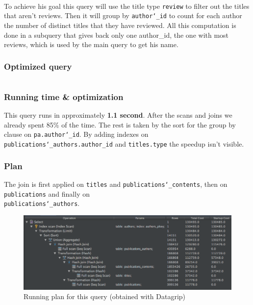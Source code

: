 \documentclass[doubleside, titlepage]{article}
\begin{document}
~\\
To achieve his goal this query will use the title type \texttt{review} to filter out the titles that aren't reviews. Then it will group by \texttt{author\char`_id} to count for each author the number of distinct titles that they have reviewed. All this computation is done in a subquery that gives back only one author_id, the one with most reviews, which is used by the main query to get his name.
~\\

\subsubsection{Optimized query}
		\begin{lstlisting}[language=SQL,showspaces=false,basicstyle=\ttfamily,numberstyle=\tiny,commentstyle=\color{gray}]

		\end{lstlisting}

\subsubsection{Running time \& optimization}

This query runs in approximately \textbf{1.1 second}. After the scans and joins we already spent 85\% of the time. The rest is taken by the sort for the group by clause on \texttt{pa.author\char`_id}. By adding indexes on \texttt{publications\char`_authors.author_id} and \texttt{titles.type} the speedup isn't visible.


\subsubsection{Plan}
The join is first applied on \texttt{titles} and \texttt{publications\char`_contents}, then on \texttt{publications} and finally on ~\\ \texttt{publications\char`_authors}.

\begin{figure}[!htb]
	\centering
    \includegraphics[scale = 0.5]{./query_analysis/query21}
    \caption{Running plan for this query (obtained with Datagrip)}
\end{figure}
\end{document}
